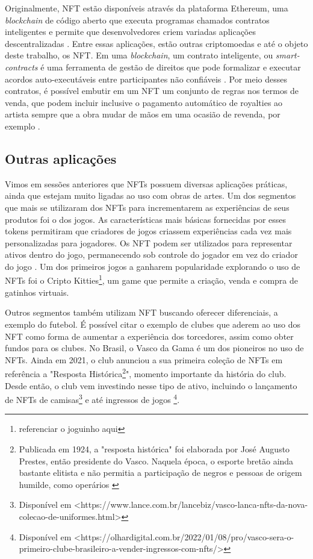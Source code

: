 Originalmente, NFT estão disponíveis através da plataforma Ethereum, uma \textit{blockchain} de código aberto que executa programas chamados contratos inteligentes e permite que desenvolvedores criem variadas aplicações descentralizadas \cite{Antonopoulos}. Entre essas aplicações, estão outras criptomoedas e até o objeto deste trabalho, os NFT. Em uma \textit{blockchain}, um contrato inteligente, ou \textit{smart-contracts} é uma ferramenta de gestão de direitos que pode formalizar e executar acordos auto-executáveis entre participantes não confiáveis \cite{Voshmgir}. Por meio desses contratos, é possível embutir em um NFT um conjunto de regras nos termos de venda, que podem incluir inclusive o pagamento automático de royalties ao artista sempre que a obra mudar de mãos em uma ocasião de revenda, por exemplo \cite{Kugler}.

\subsection{Outras aplicações}
\label{subsec: outras aplicações}

Vimos em sessões anteriores que NFTs possuem diversas aplicações práticas, ainda que estejam muito ligadas ao uso com obras de artes. Um dos segmentos que mais se utilizaram dos NFTs para incrementarem as experiências de seus produtos foi o dos jogos. As características mais básicas fornecidas por esses tokens permitiram que criadores de jogos criassem experiências cada vez mais personalizadas para jogadores. Os NFT podem ser utilizados para representar ativos dentro do jogo, permanecendo sob controle do jogador em vez do criador do jogo \cite{Voshmgir}. Um dos primeiros jogos a ganharem popularidade explorando o uso de NFTs foi o Cripto Kitties\footnote{referenciar o joguinho aqui}, um game que permite a criação, venda e compra de gatinhos virtuais. 

Outros segmentos também utilizam NFT buscando oferecer diferenciais, a exemplo do futebol. É possível citar o exemplo de clubes que aderem ao uso dos NFT como forma de aumentar a experiência dos torcedores, assim como obter fundos para os clubes. No Brasil, o Vasco da Gama é um dos pioneiros no uso de NFTs. Ainda em 2021, o club anunciou a sua primeira coleção de NFTs em referência a "Resposta Histórica\footnote{Publicada em 1924, a "resposta histórica" foi elaborada por José Augusto Prestes, então presidente do Vasco. Naquela época, o esporte bretão ainda bastante elitista e não permitia a participação de negros e pessoas de origem humilde, como operários \cite{Resposta}}", momento importante da história do club. Desde então, o club vem investindo nesse tipo de ativo, incluindo o lançamento de NFTs de camisas\footnote{Disponível em <https://www.lance.com.br/lancebiz/vasco-lanca-nfts-da-nova-colecao-de-uniformes.html>} e até ingressos de jogos \footnote{Disponível em <https://olhardigital.com.br/2022/01/08/pro/vasco-sera-o-primeiro-clube-brasileiro-a-vender-ingressos-com-nfts/>}. 



